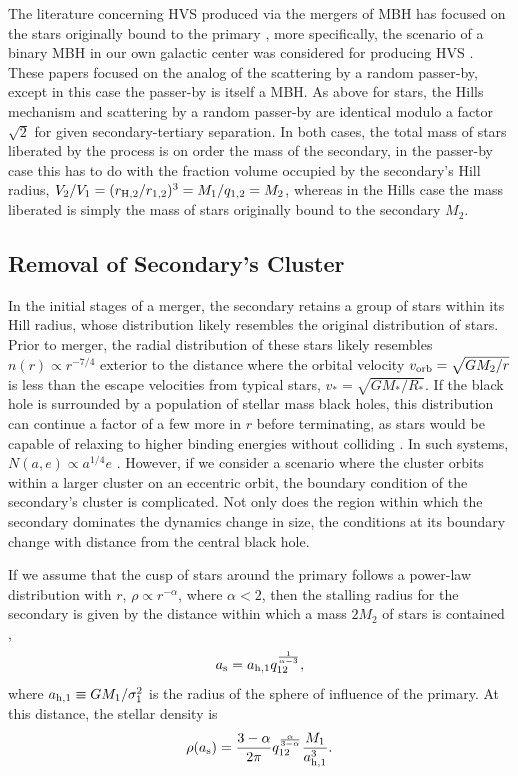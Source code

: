 \documentclass[a4paper,twocolumn]{emulateapj}
\begin{document}
{The literature concerning HVS produced via the mergers of MBH has focused on the stars originally bound to the primary \citep{Quinlan:1996a}, more specifically, the scenario of a binary MBH in our own galactic center was considered for producing HVS \citep{Yu:2003a,Sesana:2007b}. These papers focused on the analog of the scattering by a random passer-by, except in this case the passer-by is itself a MBH. As above for stars, the Hills mechanism and scattering by a random passer-by are identical modulo a factor $\sqrt{2}$ for given secondary-tertiary separation. In both cases, the total mass of stars liberated by the process is on order the mass of the secondary, in the passer-by case this has to do with the fraction volume occupied by the secondary's Hill radius, $V_{2}/V_{1} = (r_{\rm H,2}/r_{1,2})^{3} = M_{1}/q_{1,2} = M_{2}$, whereas in the Hills case the mass liberated is simply the mass of stars originally bound to the secondary $M_{2}$.

\subsection{Removal of Secondary's Cluster}
In the initial stages of a merger, the secondary retains a group of stars within its Hill radius, whose distribution likely resembles the original distribution of stars. Prior to merger, the radial distribution of these stars likely resembles $n(r) \propto r^{-7/4}$ \citep{Bahcall:1976a} exterior to the distance where the orbital velocity $v_{\rm orb} = \sqrt{G M_{2} / r}$ is less than the escape velocities from typical stars, $v_{\ast} = \sqrt{G M_{\ast} / R_{\ast}}$. If the black hole is surrounded by a population of stellar mass black holes, this distribution can continue a factor of a few more in $r$ before terminating, as stars would be capable of relaxing to higher binding energies without colliding \citep{OLeary:2008a}. In such systems, $N(a,e) \propto a^{1/4} e$ \citep{Merritt:2013a}. However, if we consider a scenario where the cluster orbits within a larger cluster on an eccentric orbit, the boundary condition of the secondary's cluster is complicated. Not only does the region within which the secondary dominates the dynamics change in size, the conditions at its boundary change with distance from the central black hole.

If we assume that the cusp of stars around the primary follows a power-law distribution with $r$, $\rho \propto r^{-\alpha}$, where $\alpha < 2$, then the stalling radius for the secondary is given by the distance within which a mass $2 M_{2}$ of stars is contained \citep{Matsubayashi:2007a},
\begin{equation}
a_{\rm s} = a_{\rm h,1} q_{12}^{\frac{1}{\alpha-3}},
\label{eq:astall}
\end{equation}
where $a_{\rm h,1} \equiv G M_{1}/\sigma_{1}^{2}$ is the radius of the sphere of influence of the primary. At this distance, the stellar density is
\begin{equation}
\rho(a_{\rm s}) = \frac{3 - \alpha}{2\pi} q_{12}^{\frac{\alpha}{3 - \alpha}} \frac{M_{1}}{a_{\rm h,1}^{3}}.
\label{eq:rhostall}
\end{equation}

}
\end{document}
